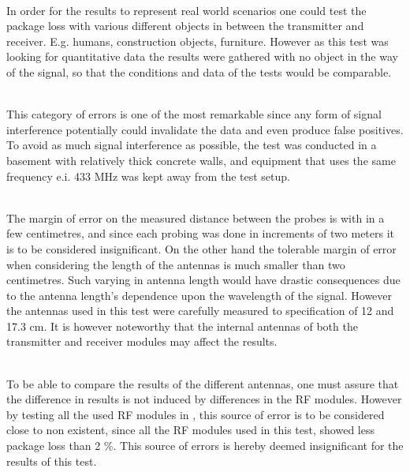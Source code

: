 \begin{description}[labelindent=\parindent]
    \item[Objects placed in the way of the signal] \hfill \\
    In order for the results to represent real world scenarios one could test the package loss with various different objects in between the transmitter and receiver. 
    E.g. humans, construction objects, furniture.
    However as this test was     looking for quantitative data the results were gathered with no object in the way of the signal, so that the conditions and data of the tests would be comparable.
    \item[Signal interference] \hfill \\
    This category of errors is one of the most remarkable since any form of signal interference potentially could invalidate the data and even produce false positives.
    To avoid as much signal interference as possible, the test was conducted in a basement with relatively thick concrete walls, and equipment that uses the same frequency e.i. 433 MHz was kept away from the test setup.
    \item[Inaccuracy in distance and antenna length] \hfill \\
    The margin of error on the measured distance between the probes is with in a few centimetres, and since each probing was done in increments of two meters it is to be considered insignificant.
    On the other hand the tolerable margin of error when considering the length of the antennas is much smaller than two centimetres.
    Such varying in antenna length would have drastic consequences due to the antenna length's dependence upon the wavelength of the signal.
    However the antennas used in this test were carefully measured to specification of 12 and 17.3 cm.
    It is however noteworthy that the internal antennas of both the transmitter and receiver modules may affect the results.
    \item[Difference in RF modules] \hfill \\
    To be able to compare the results of the different antennas, one must assure that the difference in results is not induced by differences in the RF modules.
    However by testing all the used RF modules in , this source of error is to be considered close to non existent, since all the RF modules used in this test, showed less package loss than 2 \%.
    This source of errors is hereby deemed insignificant for the results of this test.
\end{description}
  

